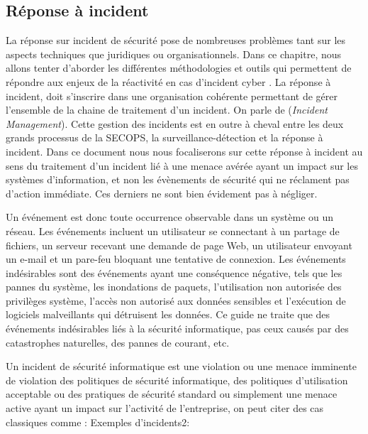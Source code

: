 \subsection{Réponse à incident}

La réponse sur incident de sécurité pose de nombreuses problèmes  tant sur les aspects techniques que juridiques ou organisationnels. Dans ce chapitre, nous allons tenter d'aborder les différentes méthodologies et outils qui permettent de répondre aux enjeux de la réactivité en cas d'incident cyber . La réponse à incident, doit s'inscrire dans une organisation cohérente permettant de gérer l'ensemble de la chaine de traitement d'un incident. On parle de  (\textit{Incident Management}). Cette gestion des incidents est en outre à cheval entre les deux grands processus  de la SECOPS, la surveillance-détection et la  réponse à incident. Dans ce document nous nous focaliserons sur cette réponse à incident au sens du traitement d'un incident lié à une menace avérée ayant un impact sur les systèmes d'information, et non les évènements de sécurité qui ne réclament pas d'action immédiate. Ces derniers ne sont bien évidement pas à négliger.

Un événement est donc toute occurrence observable dans un système ou un réseau. Les événements incluent un utilisateur se connectant à un partage de fichiers, un serveur recevant une demande de page Web, un utilisateur envoyant un e-mail et un pare-feu bloquant une tentative de connexion. Les événements indésirables sont des événements ayant une conséquence négative, tels que les pannes du système, les inondations de paquets, l'utilisation non autorisée des privilèges système, l'accès non autorisé aux données sensibles et l'exécution de logiciels malveillants qui détruisent les données. Ce guide ne traite que des événements indésirables liés à la sécurité informatique, pas ceux causés par des catastrophes naturelles, des pannes de courant, etc.


Un incident de sécurité informatique est une violation ou une menace imminente de violation des politiques de sécurité informatique, des politiques d'utilisation acceptable ou des pratiques de sécurité standard ou simplement une menace active ayant un impact sur l'activité de l'entreprise, on peut citer des cas classiques comme :  Exemples d'incidents2:

